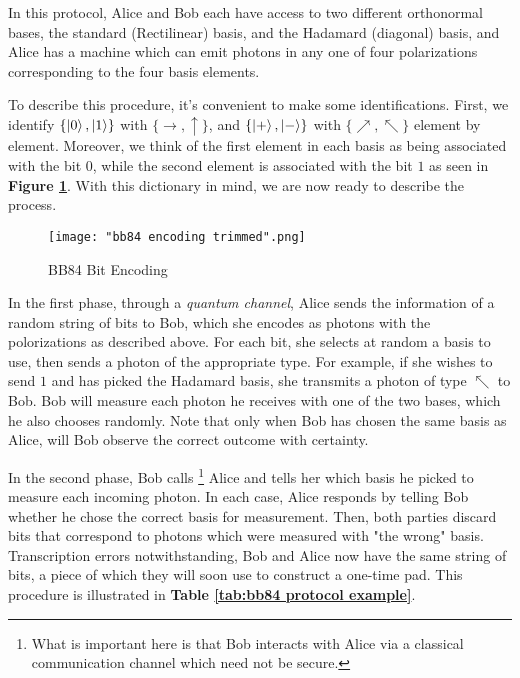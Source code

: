 In this protocol, Alice and Bob each have access to two different orthonormal bases, the standard (Rectilinear) basis, and the Hadamard (diagonal) basis, and Alice has a machine which can emit photons in any one of four polarizations corresponding to the four basis elements.  

To describe this procedure, it's convenient to make some identifications.  First, we identify $\{\ket{0},\ket{1}\}$ with $\{\rightarrow, \uparrow\}$, and $\{\ket{+}, \ket{-}\}$ with $\{\nearrow, \nwarrow\}$ element by element.  Moreover, we think of the first element in each basis as being associated with the bit $0$, while the second element is associated with the bit $1$ as seen in \textbf{Figure \ref{fig:BB84 bit encoding}}.  With this dictionary in mind, we are now ready to describe the process.

\begin{figure}[h]
    \centering
    \texttt{[image: "bb84 encoding trimmed".png]}
    \caption{BB84 Bit Encoding \protect\footnotemark}
    \label{fig:BB84 bit encoding}
\end{figure}



In the first phase, through a {\emph{quantum channel}}, Alice sends the information of a random string of bits to Bob, which she encodes as photons with the polorizations as described above. For each bit, she selects at random a basis to use, then sends a photon of the appropriate type.  For example, if she wishes to send $1$ and has picked the Hadamard basis, she transmits a photon of type $\nwarrow$ to Bob.  Bob will measure each photon he receives with one of the two bases, which he also chooses randomly. Note that only when Bob has chosen the same basis as Alice, will Bob observe the correct outcome with certainty.  

In the second phase, Bob calls \footnote{What is important here is that Bob interacts with Alice via a classical communication channel which need not be secure.} Alice and tells her which basis he picked to measure each incoming photon. In each case, Alice responds by telling Bob whether he chose the correct basis for measurement. Then, both parties discard bits that correspond to photons which were measured with "the wrong" basis. Transcription errors notwithstanding, Bob and Alice now have the same string of bits, a piece of which they will soon use to construct a one-time pad.  This procedure is illustrated in \textbf{Table \ref{tab:bb84 protocol example}}.

